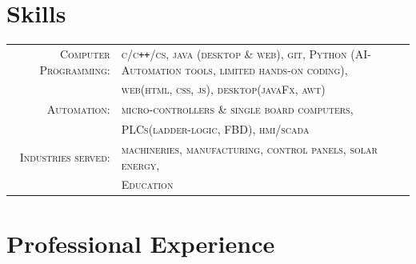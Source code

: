 \documentclass[a4paper]{article}
\begin{document}
\section{\hfill\LARGE{\textbf{Skills}}}
	\begin{tabular}{rl}	\small{}
	 	\small{}\textsc{		Computer Programming:	}	& \textsc{					\small{c/c\texttt{++}/cs}, java (desktop \& web), git, Python (AI-Automation tools, limited hands-on coding),			}	\\
  												& \textsc{					web(html, css, js), desktop(javaFx, awt)							} 	\\
 		\small{}\textsc{		Automation:			}	& \textsc{					micro-controllers \& single board computers,						}	\\
  												& \textsc{					PLCs(ladder-logic, FBD), hmi/scada								} 	\\
 		\small{}\textsc{		Industries served:		}	& \textsc{					machineries, manufacturing, control panels, solar energy,				}	\\
  												& \textsc{					Education													} 	\\
	\end{tabular}













\vspace{0em} %
\section{\hfill\LARGE{\textbf{Professional Experience}}}
\end{document}
